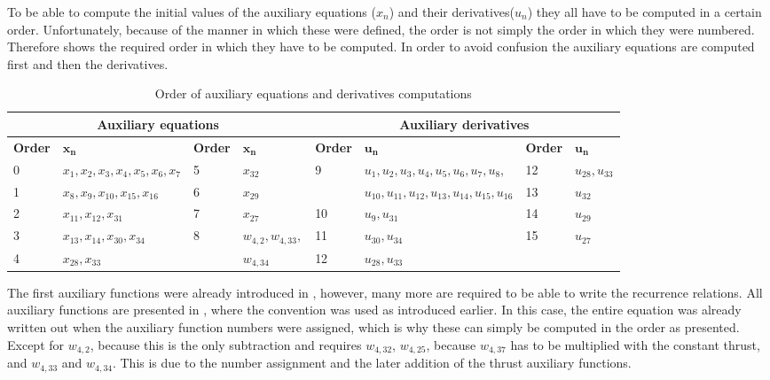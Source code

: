 To be able to compute the initial values of the auxiliary equations ($x_{n}$) and their derivatives($u_{n}$) they all have to be computed in a certain order. Unfortunately, because of the manner in which these were defined, the order is not simply the order in which they were numbered. Therefore  shows the required order in which they have to be computed. In order to avoid confusion the auxiliary equations are computed first and then the derivatives.

\begin{table}[!ht]
\begin{center}
\caption{Order of auxiliary equations and derivatives computations}
\label{tab:calcOrderAuxEq}
\begin{tabular}{|l|l||l|l||l|l||l|l|}
\hline 
\multicolumn{4}{c}{\textbf{Auxiliary equations}} & \multicolumn{4}{c}{\textbf{Auxiliary derivatives}} \\ \hline \hline
\textbf{Order} & $\mathbf{x_{n}}$ &\textbf{Order} & $\mathbf{x_{n}}$ & \textbf{Order} & $\mathbf{u_{n}}$ & \textbf{Order} & $\mathbf{u_{n}}$ \\ \hline 
0 & $ x_{1}, x_{2}, x_{3}, x_{4}, x_{5}, x_{6}, x_{7} $ & 5 & $ x_{32} $ & 9 & $ u_{1}, u_{2}, u_{3}, u_{4}, u_{5}, u_{6}, u_{7}, u_{8},  $ &  12 & $ u_{28}, u_{33} $ \\ \cline{1-4} \cline{7-8}
1 & $ x_{8}, x_{9}, x_{10}, x_{15}, x_{16} $ &  6 & $ x_{29} $ &  & $ u_{10}, u_{11}, u_{12}, u_{13}, u_{14}, u_{15}, u_{16} $ &  13 & $ u_{32} $ \\ \hline
2 & $ x_{11}, x_{12}, x_{31} $ & 7 & $ x_{27} $ & 10 & $ u_{9}, u_{31} $ &  14 & $ u_{29} $ \\ \hline
3 & $ x_{13}, x_{14}, x_{30}, x_{34} $ &  8 & $ w_{4,2}, w_{4,33}, $ & 11 & $ u_{30}, u_{34} $ &  15 & $ u_{27} $ \\ \cline{1-2} \cline{5-8}
4 & $ x_{28}, x_{33} $ &  & $ w_{4,34} $ & 12 & $ u_{28}, u_{33} $ & & $  $ \\ \hline

\end{tabular}
\end{center}
\end{table}



The first auxiliary functions were already introduced in , however, many more are required to be able to write the recurrence relations. All auxiliary functions are presented in , where the convention was used as introduced earlier. In this case, the entire equation was already written out when the auxiliary function numbers were assigned, which is why these can simply be computed in the order as presented. Except for $w_{4,2}$, because this is the only subtraction and requires $w_{4,32}$, $w_{4,25}$, because $w_{4,37}$ has to be multiplied with the constant thrust, and $w_{4,33}$ and $w_{4,34}$. This is due to the number assignment and the later addition of the thrust auxiliary functions. 


